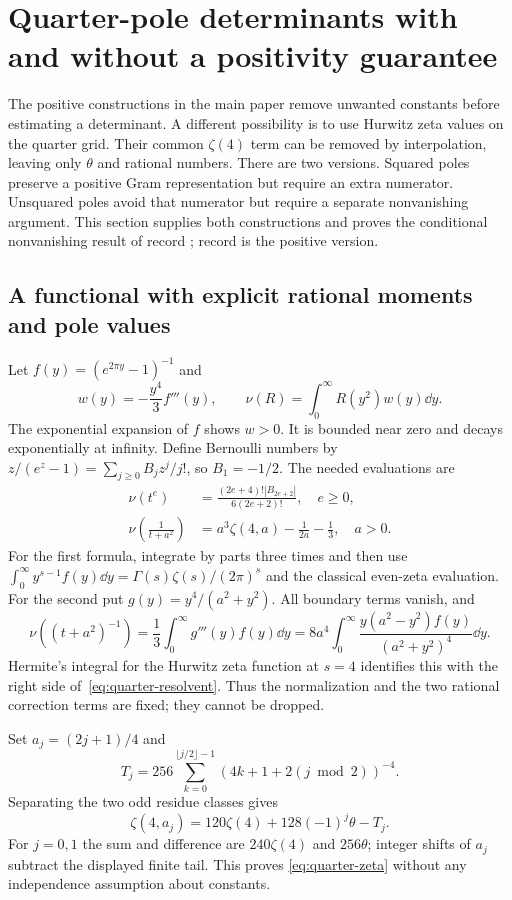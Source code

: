 \section{Quarter-pole determinants with and without a positivity guarantee}
\label{sec:quarter-case}

The positive constructions in the main paper remove unwanted constants
before estimating a determinant. A different possibility is to use
Hurwitz zeta values on the quarter grid. Their common $\zeta(4)$ term
can be removed by interpolation, leaving only $\theta$ and rational
numbers. There are two versions. Squared poles preserve a positive
Gram representation but require an extra numerator. Unsquared poles
avoid that numerator but require a separate nonvanishing argument.
This section supplies both constructions and proves the conditional
nonvanishing result of record ; record 
is the positive version.

\subsection{A functional with explicit rational moments and pole values}
Let $f(y)=(e^{2\pi y}-1)^{-1}$ and
\[
 w(y)=-\frac{y^4}3 f'''(y),\qquad
 \nu(R)=\int_0^\infty R(y^2)w(y)\dd y.
\]
The exponential expansion of $f$ shows $w>0$. It is bounded near zero
and decays exponentially at infinity. Define Bernoulli numbers by
$z/(e^z-1)=\sum_{j\geq0}B_jz^j/j!$, so $B_1=-1/2$.
The needed evaluations are
\begin{align}
 \nu(t^e)&=\frac{(2e+4)!|B_{2e+2}|}{6(2e+2)!},\quad e\geq0,
 \label{eq:quarter-moments}\\
 \nu\left(\frac1{t+a^2}\right)
     &=a^3\zeta(4,a)-\frac1{2a}-\frac13,\quad a>0.
 \label{eq:quarter-resolvent}
\end{align}
For the first formula, integrate by parts three times and then use
$\int_0^\infty y^{s-1}f(y)\dd y=\Gamma(s)\zeta(s)/(2\pi)^s$
and the classical even-zeta evaluation. For the second put
$g(y)=y^4/(a^2+y^2)$. All boundary terms vanish, and
\[
 \nu((t+a^2)^{-1})=\frac13\int_0^\infty g'''(y)f(y)\dd y
       =8a^4\int_0^\infty
            \frac{y(a^2-y^2)f(y)}{(a^2+y^2)^4}\dd y.
\]
Hermite's integral for the Hurwitz zeta function at $s=4$
\cite[Eq. 25.11.29]{DLMF} identifies this with the right side
of~\eqref{eq:quarter-resolvent}. Thus the normalization and the two
rational correction terms are fixed; they cannot be dropped.

Set $a_j=(2j+1)/4$ and
\[
 T_j=256\sum_{k=0}^{\lfloor j/2\rfloor-1}
             (4k+1+2(j\bmod2))^{-4}.
\]
Separating the two odd residue classes gives
\begin{equation}\label{eq:quarter-zeta}
 \zeta(4,a_j)=120\zeta(4)+128(-1)^j\theta-T_j.
\end{equation}
For $j=0,1$ the sum and difference are $240\zeta(4)$ and $256\theta$;
integer shifts of $a_j$ subtract the displayed finite tail. This proves
\eqref{eq:quarter-zeta} without any independence assumption about constants.

